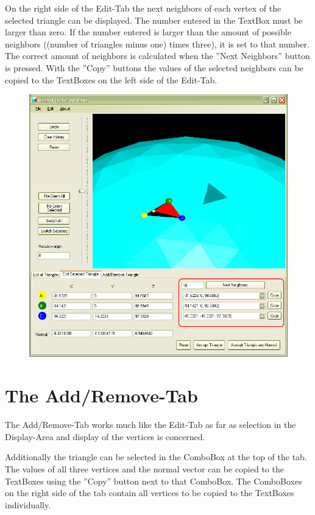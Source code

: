 On the right side of the Edit-Tab the next neighbors of each vertex of the selected triangle can be displayed. The number entered in the TextBox must be larger than zero. If the number entered is larger than the amount of possible neighbors ((number of triangles minus one) times three), it is set to that number. The correct amount of neighbors is calculated when the ''Next Neighbors'' button is pressed. With the ''Copy'' buttons the values of the selected neighbors can be copied to the TextBoxes on the left side of the Edit-Tab.

\begin{figure}[htb]
	\centering
	\includegraphics[width=0.8\linewidth]{window7}
\end{figure}

\newpage
\section{The Add/Remove-Tab}

The Add/Remove-Tab works much like the Edit-Tab as far as selection in the Display-Area and display of the vertices is concerned.

Additionally the triangle can be selected in the ComboBox at the top of the tab. The values of all three vertices and the normal vector can be copied to the TextBoxes using the ''Copy'' button next to that ComboBox. The ComboBoxes on the right side of the tab contain all vertices to be copied to the TextBoxes individually.

